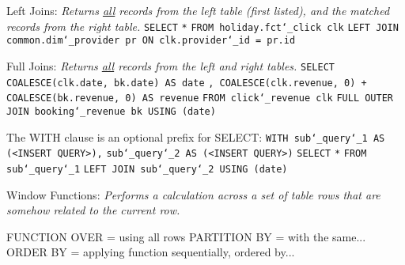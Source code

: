 \vspace{\baselineskip}
Left Joins:\newline
\textit{Returns \underline{all} records from the left table (first listed), and the matched records from the right table.}\newline
\texttt{SELECT}\newline
\texttt{*}\newline
\texttt{FROM holiday.fct\char`_click clk}\newline
\texttt{LEFT JOIN common.dim\char`_provider pr ON clk.provider\char`_id = pr.id}

\vspace{\baselineskip}
Full Joins:\newline
\textit{Returns \underline{all} records from the left and right tables.}\newline
\texttt{SELECT}\newline
\texttt{COALESCE(clk.date, bk.date) AS date}\newline
\texttt{, COALESCE(clk.revenue, 0) + COALESCE(bk.revenue, 0) AS revenue}\newline
\texttt{FROM click\char`_revenue clk}\newline
\texttt{FULL OUTER JOIN booking\char`_revenue bk USING (date)}

\vspace{\baselineskip}
The WITH clause is an optional prefix for SELECT:\newline
\texttt{WITH sub\char`_query\char`_1 AS (<INSERT QUERY>),}\newline
\texttt{sub\char`_query\char`_2 AS (<INSERT QUERY>)}\newline\newline
\texttt{SELECT}\newline
\texttt{*}\newline
\texttt{FROM sub\char`_query\char`_1}\newline
\texttt{LEFT JOIN sub\char`_query\char`_2 USING (date)}

\newpage

Window Functions:\newline
\textit{Performs a calculation across a set of table rows that are somehow related to the current row.}

FUNCTION\newline
OVER = using all rows\newline
PARTITION BY = with the same...\newline
ORDER BY = applying function sequentially, ordered by...

